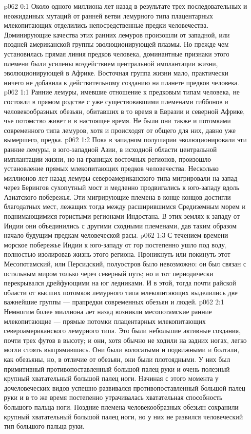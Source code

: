 \author{Носитель Жизни}
\vs p062 0:1 Около одного миллиона лет назад в результате трех последовательных и неожиданных мутаций от ранней ветви лемурного типа плацентарных млекопитающих отделились непосредственные предки человечества. Доминирующие качества этих ранних лемуров произошли от западной, или поздней американской группы эволюционирующей плазмы. Но прежде чем установилась прямая линия предков человека, доминантные признаки этого племени были усилены воздействием центральной имплантации жизни, эволюционирующей в Африке. Восточная группа жизни мало, практически ничего не добавила к действительному созданию на планете предков человека.
\vs p062 1:1 Ранние лемуры, имевшие отношение к предковым типам человека, не состояли в прямом родстве с уже существовавшими племенами гиббонов и человекообразных обезьян, обитавших в то время в Евразии и северной Африке, чье потомство живет и в настоящее время. Не были они также и потомками современного типа лемуров, хотя и происходят от общего для них, давно уже вымершего, предка.
\vs p062 1:2 Пока в западном полушарии эволюционировали эти ранние лемуры, в юго\hyp{}западной Азии, в исходной области центральной имплантации жизни, но на границах восточных регионов, произошло установление прямых млекопитающих предков человечества. Несколько миллионов лет назад лемуры североамериканского типа мигрировали на запад через Берингов сухопутный мост и медленно продвигались к юго\hyp{}западу вдоль Азиатского побережья. Эти мигрирующие племена в конце концов достигли благодатных мест, лежащих тогда между расширившимся Средиземным морем и поднимающимися гористыми регионами Индостана. В этих землях к западу от Индии они объединились с другими сходными племенами, дав таким образом начало будущим предкам человеческой расы.
\vs p062 1:3 С течением времени морское побережье Индии к юго\hyp{}западу от гор постепенно ушло под воду, полностью изолировав жизнь этого региона. Проникнуть или покинуть этот Месопотамский, или Персидский, полуостров было невозможно: он был связан с остальным миром только через северный путь; но и тот периодически перекрывался дрейфующими на юг ледниками. И в этой, тогда почти райской области от высших потомков лемурного типа млекопитающих выделились две важнейшие группы --- прапредки современных обезьян и людей.
\vs p062 2:1 Немногим более миллиона лет назад  возникли месопотамские ранние млекопитающие --- прямые потомки плацентарных млекопитающих североамериканского лемурного типа. Это были небольшие активные создания, почти трех футов в высоту; и они, хотя обычно не ходили на задних ногах, легко могли стоять выпрямившись. Они были волосатыми и подвижными и болтали, как обезьяны, но, в отличие от обезьян, они были плотоядными. У них был примитивный противопоставленный большой палец руки и очень полезный крупный хватательный большой палец ноги. Начиная с этого момента у дочеловеческих видов успешно развивался противопоставленный большой палец руки и в то же время постепенно утрачивалась хватательная способность большого пальца ноги. Поздние племена человекообразных обезьян сохранили крупный хватательный большой палец ноги, но у них не развился человеческий тип большого пальца руки.
